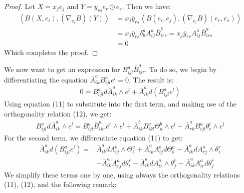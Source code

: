 \documentclass[11pt]{amsart}
\theoremstyle{definition}
\def \la { \left\langle }
\def \ra { \right\rangle }
\begin{document}
\begin{proof}  Let $X = x_j e_j$ and $Y = y_{rs} e_r \odot e_s$.  Then we have:
%
\begin{align*}
\la B( X, e_i ), (\nabla_{e_i} B) ( Y ) \ra &= x_j \bar{y}_{rs} \la B(e_i, e_j), ( \nabla_{e_i} B )( e_r, e_s ) \ra \\
&= x_j \bar{y}_{rs} \delta^a_b A^a_{ij} \bar{B}^b_{irs} = x_j \bar{y}_{rs} A^a_{ij} \bar{B}^a_{irs} \\
&= 0
\end{align*}
%
Which completes the proof.
%
\end{proof}

We now want to get an expression for $B^a_{ijl} \bar{B}^a_{ijr}$.  To do so, we begin by differentiating the equation $\bar{A}^a_{ik} B^a_{ijl} e^l = 0$.  The result is:
%
\begin{align*}
0 = B^a_{ijl} d \bar{A}^a_{ik} \wedge e^l + \bar{A}^a_{ik} d( B^a_{ijl} e^l ) 
\end{align*}
%
Using equation (11) to substitute into the first term, and making use of the orthogonality relation (12), we get:
%
\begin{align*}
B^a_{ijl} d \bar{A}^a_{ik} \wedge e^l= B^a_{ijl} \bar{B}^a_{ikr} \bar{e}^r \wedge e^l + \bar{A}^b_{ik} B^a_{ikl} \Theta^b_a \wedge e^l - \bar{A}^a_{rk} B^a_{ijl}  \theta^i_r \wedge e^l
\end{align*}
%
For the second term, we differentiate equation (11) to get:
%
\begin{align*}
\bar{A}^a_{ik} d( B^a_{ijl} e^l ) =& \bar{A}^a_{ik} d A^b_{ij} \wedge \Theta^a_b + \bar{A}^a_{ik} A^b_{ij} d \Theta^a_b - \bar{A}^a_{ik} d
A^a_{rj} \wedge \theta^r_i \\
&- \bar{A}^a_{ik} A^a_{rj} d \theta^r_i - \bar{A}^a_{ik} d A^a_{ir} \wedge \theta^r_j - \bar{A}^a_{ik} A^a_{ir} d \theta^r_j
\end{align*}
%
We simplify these terms one by one, using always the orthogonality relations (11), (12), and the following remark:
\end{document}
